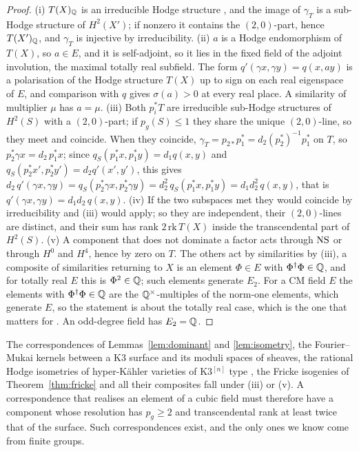 \begin{proof}
(i) $T(X)_{\mathbb{Q}}$ is an irreducible Hodge structure \cite{Zar83}, and the image of $\gamma_{T}$ is a sub-Hodge structure of $H^{2}(X')$; if nonzero it contains the $(2,0)$-part, hence $T(X')_{\mathbb{Q}}$, and $\gamma_{T}$ is injective by irreducibility. (ii) $a$ is a Hodge endomorphism of $T(X)$, so $a\in E$, and it is self-adjoint, so it lies in the fixed field of the adjoint involution, the maximal totally real subfield. The form $q'(\gamma x,\gamma y)=q(x,ay)$ is a polarisation of the Hodge structure $T(X)$ up to sign on each real eigenspace of $E$, and comparison with $q$ gives $\sigma(a)>0$ at every real place. A similarity of multiplier $\mu$ has $a=\mu$. (iii) Both $p_{i}^{*}T$ are irreducible sub-Hodge structures of $H^{2}(S)$ with a $(2,0)$-part; if $p_{g}(S)\le1$ they share the unique $(2,0)$-line, so they meet and coincide. When they coincide, $\gamma_{T}=p_{2*}p_{1}^{*}=d_{2}(p_{2}^{*})^{-1}p_{1}^{*}$ on $T$, so $p_{2}^{*}\gamma x=d_{2}\,p_{1}^{*}x$; since $q_{S}(p_{1}^{*}x,p_{1}^{*}y)=d_{1}q(x,y)$ and $q_{S}(p_{2}^{*}x',p_{2}^{*}y')=d_{2}q'(x',y')$, this gives $d_{2}\,q'(\gamma x,\gamma y)=q_{S}(p_{2}^{*}\gamma x,p_{2}^{*}\gamma y)=d_{2}^{2}\,q_{S}(p_{1}^{*}x,p_{1}^{*}y)=d_{1}d_{2}^{2}\,q(x,y)$, that is $q'(\gamma x,\gamma y)=d_{1}d_{2}\,q(x,y)$. (iv) If the two subspaces met they would coincide by irreducibility and (iii) would apply; so they are independent, their $(2,0)$-lines are distinct, and their sum has rank $2\,\mathrm{rk}\,T(X)$ inside the transcendental part of $H^{2}(S)$. (v) A component that does not dominate a factor acts through $\mathrm{NS}$ or through $H^{0}$ and $H^{4}$, hence by zero on $T$. The others act by similarities by (iii), a composite of similarities returning to $X$ is an element $\Phi\in E$ with $\Phi^{\dagger}\Phi\in\mathbb{Q}$, and for totally real $E$ this is $\Phi^{2}\in\mathbb{Q}$; such elements generate $E_{2}$. For a CM field $E$ the elements with $\Phi^{\dagger}\Phi\in\mathbb{Q}$ are the $\mathbb{Q}^{\times}$-multiples of the norm-one elements, which generate $E$, so the statement is about the totally real case, which is the one that matters for \Fiii{}. An odd-degree field has $E_{2}=\mathbb{Q}$.
\end{proof}

The correspondences of Lemmas~\ref{lem:dominant} and \ref{lem:isometry}, the Fourier--Mukai kernels between a K3 surface and its moduli spaces of sheaves, the rational Hodge isometries of hyper-K\"ahler varieties of K3$^{[n]}$ type \cite{Mar24}, the Fricke isogenies of Theorem~\ref{thm:fricke} and all their composites fall under (iii) or (v). A correspondence that realises an element of a cubic field must therefore have a component whose resolution has $p_{g}\ge2$ and transcendental rank at least twice that of the surface. Such correspondences exist, and the only ones we know come from finite groups.

